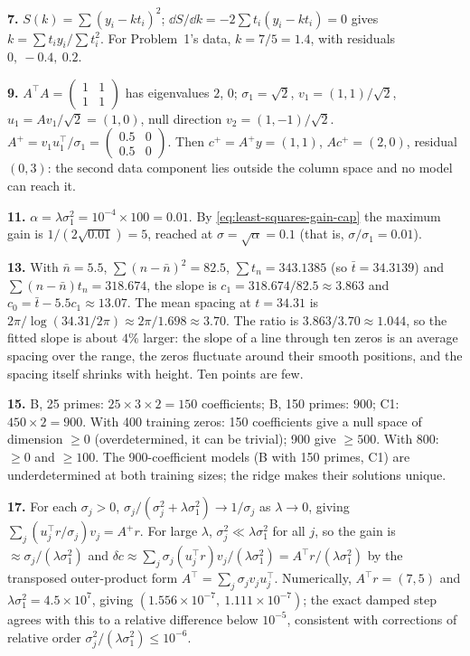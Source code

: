 \textbf{7.} $S(k) = \sum(y_i - kt_i)^2$; $\dd S/\dd k = -2\sum t_i(y_i - kt_i) = 0$ gives $k = \sum t_iy_i/\sum t_i^2$. For Problem~1's data, $k = 7/5 = 1.4$, with residuals $0,\ -0.4,\ 0.2$.

\textbf{9.} $A^\top A = \begin{pmatrix}1&1\\1&1\end{pmatrix}$ has eigenvalues $2$, $0$; $\sigma_1 = \sqrt2$, $v_1 = (1,1)/\sqrt2$, $u_1 = Av_1/\sqrt2 = (1,0)$, null direction $v_2 = (1,-1)/\sqrt2$. $A^+ = v_1u_1^\top/\sigma_1 = \begin{pmatrix}0.5&0\\0.5&0\end{pmatrix}$. Then $c^+ = A^+y = (1,1)$, $Ac^+ = (2,0)$, residual $(0,3)$: the second data component lies outside the column space and no model can reach it.

\textbf{11.} $\alpha = \lambda\sigma_1^2 = 10^{-4}\times100 = 0.01$. By \cref{eq:least-squares-gain-cap} the maximum gain is $1/(2\sqrt{0.01}) = 5$, reached at $\sigma = \sqrt\alpha = 0.1$ (that is, $\sigma/\sigma_1 = 0.01$).

\textbf{13.} With $\bar n = 5.5$, $\sum(n-\bar n)^2 = 82.5$, $\sum t_n = 343.1385$ (so $\bar t = 34.3139$) and $\sum(n-\bar n)t_n = 318.674$, the slope is $c_1 = 318.674/82.5\approx3.863$ and $c_0 = \bar t - 5.5c_1\approx13.07$. The mean spacing at $t = 34.31$ is $2\pi/\log(34.31/2\pi)\approx 2\pi/1.698\approx3.70$. The ratio is $3.863/3.70\approx1.044$, so the fitted slope is about $4\%$ larger: the slope of a line through ten zeros is an average spacing over the range, the zeros fluctuate around their smooth positions, and the spacing itself shrinks with height. Ten points are few.

\textbf{15.} B, 25 primes: $25\times3\times2 = 150$ coefficients; B, 150 primes: $900$; C1: $450\times2 = 900$. With 400 training zeros: 150 coefficients give a null space of dimension $\ge 0$ (overdetermined, it can be trivial); 900 give $\ge 500$. With 800: $\ge0$ and $\ge100$. The 900-coefficient models (B with 150 primes, C1) are underdetermined at both training sizes; the ridge makes their solutions unique.

\textbf{17.} For each $\sigma_j>0$, $\sigma_j/(\sigma_j^2+\lambda\sigma_1^2)\to1/\sigma_j$ as $\lambda\to0$, giving $\sum_j(u_j^\top r/\sigma_j)v_j = A^+r$. For large $\lambda$, $\sigma_j^2\ll\lambda\sigma_1^2$ for all $j$, so the gain is $\approx\sigma_j/(\lambda\sigma_1^2)$ and $\delta c\approx\sum_j\sigma_j(u_j^\top r)v_j/(\lambda\sigma_1^2) = A^\top r/(\lambda\sigma_1^2)$ by the transposed outer-product form $A^\top = \sum_j\sigma_jv_ju_j^\top$. Numerically, $A^\top r = (7,5)$ and $\lambda\sigma_1^2 = 4.5\times10^7$, giving $(1.556\times10^{-7},\ 1.111\times10^{-7})$; the exact damped step agrees with this to a relative difference below $10^{-5}$, consistent with corrections of relative order $\sigma_j^2/(\lambda\sigma_1^2)\le10^{-6}$.

